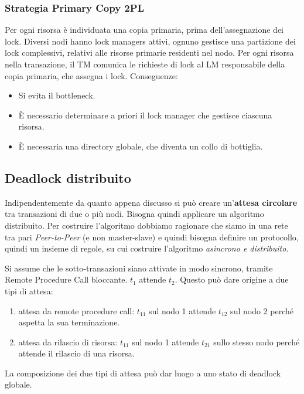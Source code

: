\subsubsection{Strategia Primary Copy 2PL}
Per ogni risorsa è individuata una copia primaria, prima dell’assegnazione dei lock.
Diversi nodi hanno lock managers attivi, ognuno gestisce una partizione dei lock complessivi, relativi alle risorse primarie residenti nel nodo.
Per ogni risorsa nella transazione, il TM comunica le richieste di lock al LM responsabile della copia primaria, che assegna i lock.
Conseguenze:
\begin{itemize}
    \item Si evita il bottleneck.
    \item È necessario determinare a priori il lock manager che gestisce ciascuna risorsa.
    \item  È necessaria una directory globale, che diventa un collo di bottiglia.
\end{itemize}

\subsection{Deadlock distribuito}
Indipendentemente da quanto appena discusso si può creare un'\textbf{attesa circolare} tra transazioni di due o più nodi. Bisogna quindi applicare un algoritmo distribuito. Per costruire l'algoritmo dobbiamo ragionare che siamo in una rete tra pari \textit{Peer-to-Peer} (e non master-slave) e quindi bisogna definire un protocollo, quindi un insieme di regole, su cui costruire l'algoritmo \textit{asincrono e distribuito}.


Si assume che le sotto-transazioni siano attivate in modo sincrono, tramite Remote Procedure Call bloccante. $t_1$ attende $t_2$.
Questo può dare origine a due tipi di attesa:
\begin{enumerate}
    \item attesa da remote procedure call: $t_{11}$ sul nodo 1 attende $t_{12}$ sul nodo 2 perché aspetta la sua terminazione.
    \item attesa da rilascio di risorsa: $t_{11}$ sul nodo 1 attende $t_{21}$ sullo stesso nodo perché attende il rilascio di una risorsa. 
\end{enumerate}
La composizione dei due tipi di attesa può dar luogo a uno stato di deadlock globale.

